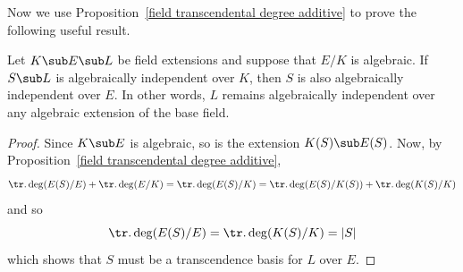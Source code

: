 Now we use Proposition~\ref{field transcendental degree additive} to prove the following useful result.
\begin{proposition}\label{field transcendence remained under algebraic extension}
Let $K\sub E\sub L$ be field extensions and suppose that $E/K$ is algebraic. If $S\sub L$ is algebraically independent over $K$, then $S$ is also algebraically independent over $E$. In other words, $L$ remains algebraically independent over any algebraic extension of the base field.
\end{proposition}
\begin{proof}
Since $K\sub E$ is algebraic, so is the extension $K(S)\sub E(S)$. Now, by Proposition~\ref{field transcendental degree additive},
\[\tr.\deg(E(S)/E)+\tr.\deg(E/K)=\tr.\deg(E(S)/K)=\tr.\deg(E(S)/K(S))+\tr.\deg(K(S)/K)\]
and so
\[\tr.\deg(E(S)/E)=\tr.\deg(K(S)/K)=|S|\]
which shows that $S$ must be a transcendence basis for $L$ over $E$.
\end{proof}
